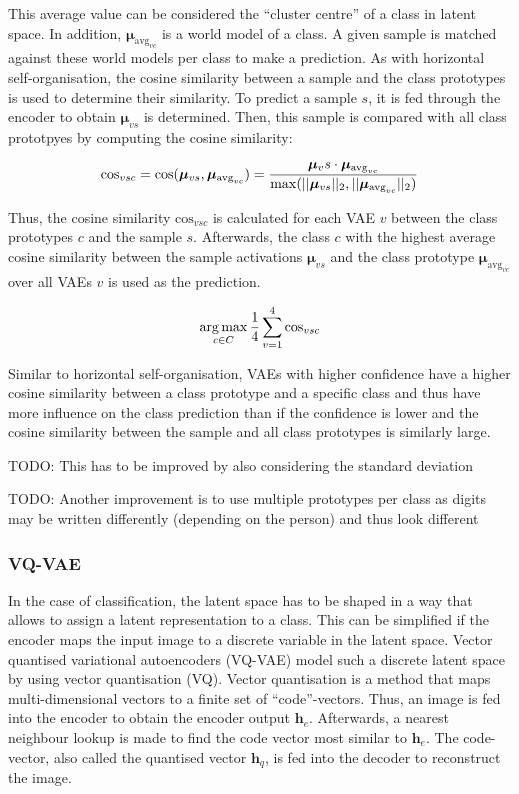 This average value can be considered the ``cluster centre'' of a class in latent space. In addition, $\boldsymbol{\mu}_{\text{avg}_{vc}}$ is a world model of a class. A given sample is matched against these world models per class to make a prediction. As with horizontal self-organisation, the cosine similarity between a sample and the class prototypes is used to determine their similarity. To predict a sample $s$, it is fed through the encoder to obtain $\boldsymbol{\mu}_{vs}$ is determined. Then, this sample is compared with all class prototpyes by computing the cosine similarity: 

\begin{align}\eqlbl{hso_13}
		\text{cos}_{vsc} = \text{cos}(\boldsymbol{\mu}_{vs}, \boldsymbol{\mu}_{\text{avg}_{vc}}) = \frac{\boldsymbol{\mu}_vs \cdot \boldsymbol{\mu}_{\text{avg}_{vc}}}{\max(||\boldsymbol{\mu}_{vs}||_2, ||\boldsymbol{\mu}_{\text{avg}_{vc}}||_2)}
\end{align}

Thus, the cosine similarity $\text{cos}_{vsc}$ is calculated for each VAE $v$ between the class prototypes $c$ and the sample $s$.
Afterwards, the class $c$ with the highest average cosine similarity between the sample activations $\boldsymbol{\mu}_{vs}$ and the class prototype $\boldsymbol{\mu}_{\text{avg}_{vc}}$ over all VAEs $v$ is used as the prediction.

\begin{align}\eqlbl{hso_14}
		\argmax_{c \in C} \frac{1}{4} \sum_{v=1}^{4} \text{cos}_{vsc}
\end{align}

Similar to horizontal self-organisation, VAEs with higher confidence have a higher cosine similarity between a class prototype and a specific class and thus have more influence on the class prediction than if the confidence is lower and the cosine similarity between the sample and all class prototypes is similarly large.

TODO: This has to be improved by also considering the standard deviation


TODO: Another improvement is to use multiple prototypes per class as digits may be written differently (depending on the person) and thus look different


\subsubsection{VQ-VAE}
In the case of classification, the latent space has to be shaped in a way that allows to assign a latent representation to a class.
This can be simplified if the encoder maps the input image to a discrete variable in the latent space.
Vector quantised variational autoencoders (VQ-VAE)  model such a discrete latent space by using vector quantisation (VQ).
Vector quantisation is a method that maps multi-dimensional vectors to a finite set of ``code''-vectors.
Thus, an image is fed into the encoder to obtain the encoder output $\boldsymbol{h}_e$.
Afterwards, a nearest neighbour lookup is made to find the code vector most similar to $\boldsymbol{h}_e$.
The code-vector, also called the quantised vector $\boldsymbol{h}_q$, is fed into the decoder to reconstruct the image.


